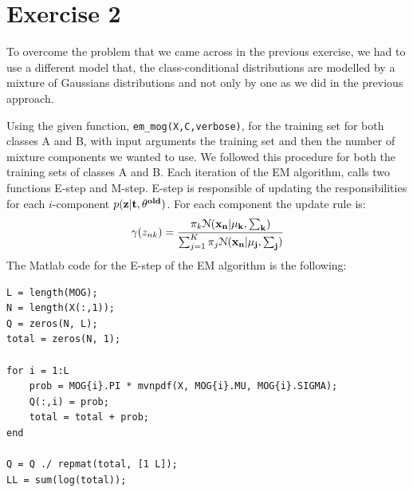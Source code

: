 \documentclass[a4paper,11pt]{article}
\begin{document}
\section*{Exercise 2}
To overcome the problem that we came across in the previous exercise, we had to use a different model that, the class-conditional distributions are modelled by a mixture of Gaussians distributions and not only by one as we did in the previous approach. 

Using the given function, \texttt{em\_mog(X,C,verbose)}, for the training set for both classes A and B, with input arguments the training set and then the number of mixture components we wanted to use. We followed this procedure for
both the training sets of classes A and B. Each iteration of the EM algorithm, calls two functions E-step and M-step.
E-step is responsible of updating the responsibilities for each $i$-component $ p(\textbf{z} | \textbf{t} , \bf{ \theta}^{old})$. For each component the update rule is:
\[
\gamma(z_{nk}) = \cfrac{\pi_k \mathcal{N}(\bf{x}_n | \bf{\mu}_k, \bf{\sum}_k)}{\sum_{j=1}^{K} \pi_j \mathcal{N}(\bf{x}_n | \bf{\mu}_j, \bf{\sum}_j)}
\]
The Matlab code for the E-step of the EM algorithm is the following:
\begin{verbatim}
L = length(MOG);
N = length(X(:,1));
Q = zeros(N, L);
total = zeros(N, 1);

for i = 1:L
    prob = MOG{i}.PI * mvnpdf(X, MOG{i}.MU, MOG{i}.SIGMA);
    Q(:,i) = prob;
    total = total + prob;
end

Q = Q ./ repmat(total, [1 L]);
LL = sum(log(total));
\end{verbatim}
\end{document}
